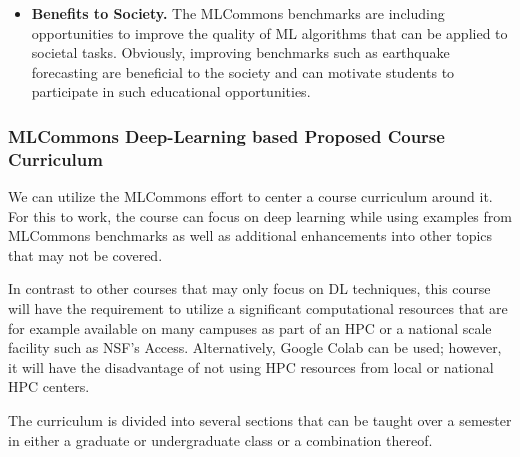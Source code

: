 \documentclass[utf8]{FrontiersinVancouver} %
\begin{document}
\begin{itemize}
  \item {\bf Benefits to Society.} The MLCommons benchmarks are
    including opportunities to improve the quality of ML algorithms
    that can be applied to societal tasks. Obviously, improving
    benchmarks such as earthquake forecasting are beneficial to the
    society and can motivate students to participate in such
    educational opportunities.

\end{itemize}


\subsubsection{MLCommons Deep-Learning based Proposed Course Curriculum}

We can utilize the MLCommons effort to center a course curriculum
around it. For this to work, the course can focus on deep
learning while using examples from MLCommons benchmarks as well as
additional enhancements into other topics that may not be covered.

In contrast to other courses that may only focus on DL techniques,
this course will have the requirement to utilize a significant
computational resources that are for example available on many
campuses as part of an HPC or a national scale facility such as
NSF's Access. Alternatively, Google Colab can be used; however, it will have
the disadvantage of not using HPC resources from local or national HPC
centers.

The curriculum is divided into several sections that can be taught
over a semester in either a graduate or undergraduate class or a
combination thereof.
\end{document}
